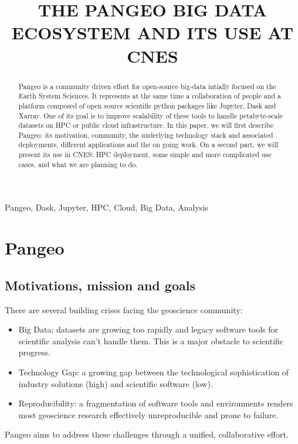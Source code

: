 \documentclass{article}
\title{THE PANGEO BIG DATA ECOSYSTEM AND ITS USE AT CNES}
\begin{document}
%
\maketitle
%
\begin{abstract}
Pangeo\cite{b1} is a community driven effort for open-source big-data intially focused on the Earth System Sciences. It represents at the same time a collaboration of people and a platform composed of open source scientific python packages like Jupyter, Dask and Xarray. One of its goal is to improve scalability of these tools to handle petabyte-scale datasets on HPC or public cloud infrastructure.
In this paper, we will first describe Pangeo: its motivation, community, the underlying technology stack and associated deployments, different applications and the on going work. On a second part, we will present its use in CNES: HPC deployment, some simple and more complicated use cases, and what we are planning to do.
\end{abstract}
%
\begin{keywords}
Pangeo, Dask, Jupyter, HPC, Cloud, Big Data, Analysis
\end{keywords}
%
\section{Pangeo}
\label{sec:pangeo}

\subsection{Motivations, mission and goals}
\label{ssec:motivations}

There are several building crises facing the geoscience community:

\begin{itemize}
\item Big Data: datasets are growing too rapidly and legacy software tools for scientific analysis can’t handle them. This is a major obstacle to scientific progress.
\item Technology Gap: a growing gap between the technological sophistication of industry solutions (high) and scientific software (low).
\item Reproducibility: a fragmentation of software tools and environments renders most geoscience research effectively unreproducible and prone to failure.
\end{itemize}

Pangeo aims to address these challenges through a unified, collaborative effort.
\end{document}
